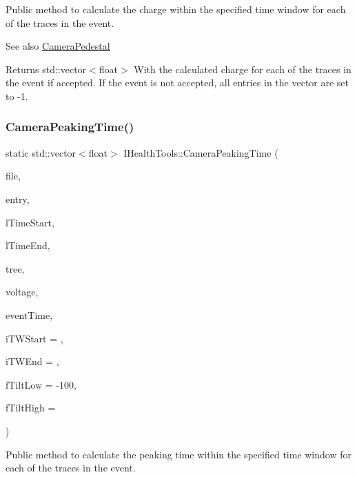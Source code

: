 Public method to calculate the charge within the specified time window for each of the traces in the event. 

\begin{DoxySeeAlso}{See also}
\hyperlink{classIHealthTools_aa6bdf03f0f7595eec0a894c7c73134ea}{Camera\+Pedestal}
\end{DoxySeeAlso}
\begin{DoxyReturn}{Returns}
std\+::vector$<$float$>$ With the calculated charge for each of the traces in the event if accepted. If the event is not accepted, all entries in the vector are set to -\/1. 
\end{DoxyReturn}
\mbox{\label{classIHealthTools_ac312d1227c3c1bf187dd4a4ea69fff7f}} 
\subsubsection{\texorpdfstring{Camera\+Peaking\+Time()}{CameraPeakingTime()}}
{\footnotesize\ttfamily static std\+::vector$<$float$>$ I\+Health\+Tools\+::\+Camera\+Peaking\+Time (\begin{DoxyParamCaption}\item[{\hyperlink{classIFile}{I\+File} $\ast$}]{file,  }\item[{int}]{entry,  }\item[{unsigned long long}]{l\+Time\+Start,  }\item[{unsigned long long}]{l\+Time\+End,  }\item[{std\+::string}]{tree,  }\item[{float}]{voltage,  }\item[{unsigned long long $\ast$}]{event\+Time,  }\item[{int}]{i\+T\+W\+Start = {},  }\item[{int}]{i\+T\+W\+End = {},  }\item[{float}]{f\+Tilt\+Low = {\ttfamily -\/100},  }\item[{float}]{f\+Tilt\+High = {} }\end{DoxyParamCaption})\hspace{0.3cm}{\ttfamily [static]}}



Public method to calculate the peaking time within the specified time window for each of the traces in the event. 

